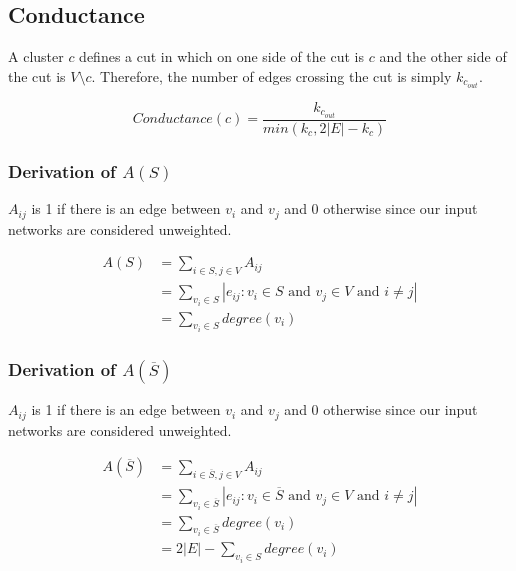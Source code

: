 \documentclass[aps,pre,superscriptaddress]{revtex4}
\begin{document}
\subsection{Conductance}
A cluster $c$ defines a cut in which on one side of the cut is $c$ and the other side of the cut is $V \setminus c$. Therefore, the number of edges crossing the cut is simply $k_{c_{out}}$.


\begin{equation}
	Conductance(c) = \frac{k_{c_{out}}}{min(k_{c}, 2|E|-k_{c})}
\end{equation}

\subsubsection{Derivation of $A(S)$}
$A_{ij}$ is 1 if there is an edge between $v_{i}$ and $v_{j}$ and 0 otherwise since our input networks are considered unweighted.

\begin{align}
	A(S) & = \sum_{i \in S,j\in V}{A_{ij}}                                                                \\
	     & = \sum_{v_{i} \in S}{|{e_{ij} : v_{i} \in S \text{ and } v_{j} \in V \text { and } i \neq j}|} \\
	     & = \sum_{v_{i} \in S}{degree(v_{i})}
\end{align}

\subsubsection{Derivation of $A(\overline{S})$}
$A_{ij}$ is 1 if there is an edge between $v_{i}$ and $v_{j}$ and 0 otherwise since our input networks are considered unweighted.

\begin{align}
	A(\overline{S}) & = \sum_{i \in \overline{S},j\in V}{A_{ij}}                                                                           \\
	                & = \sum_{v_{i} \in \overline{S}}{|{e_{ij} : v_{i} \in \overline{S} \text{ and } v_{j} \in V \text { and } i \neq j}|} \\
	                & = \sum_{v_{i} \in \overline{S}}{degree(v_{i})}                                                                       \\
	                & = 2|E| - \sum_{v_{i} \in S}{degree(v_{i})}
\end{align}
\end{document}
